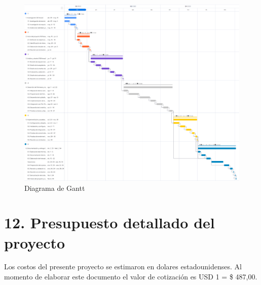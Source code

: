 \documentclass[
11pt, %
]{charter}
\begin{document}
\begin{landscape}
\begin{figure}[htpb]
\centering 
\includegraphics[height=1\textheight]{./Figuras/Gantt-2.png}
\caption{Diagrama de Gantt}
\label{fig:diagGantt}
\end{figure}

\end{landscape}




\section{12. Presupuesto detallado del proyecto}
\label{sec:presupuesto}

Los costos del presente proyecto se estimaron en dolares estadounidenses. Al momento de elaborar este documento el valor de cotización es USD 1 = \$ 487,00. 
\end{document}
